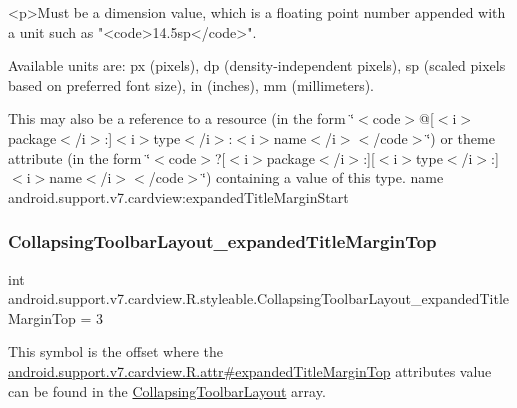 \begin{DoxyVerb}      <p>Must be a dimension value, which is a floating point number appended with a unit such as "<code>14.5sp</code>".
\end{DoxyVerb}
 Available units are\+: px (pixels), dp (density-\/independent pixels), sp (scaled pixels based on preferred font size), in (inches), mm (millimeters). 

This may also be a reference to a resource (in the form \char`\"{}$<$code$>$@\mbox{[}$<$i$>$package$<$/i$>$\+:\mbox{]}$<$i$>$type$<$/i$>$\+:$<$i$>$name$<$/i$>$$<$/code$>$\char`\"{}) or theme attribute (in the form \char`\"{}$<$code$>$?\mbox{[}$<$i$>$package$<$/i$>$\+:\mbox{]}\mbox{[}$<$i$>$type$<$/i$>$\+:\mbox{]}$<$i$>$name$<$/i$>$$<$/code$>$\char`\"{}) containing a value of this type.  name android.\+support.\+v7.\+cardview\+:expanded\+Title\+Margin\+Start \mbox{\label{classandroid_1_1support_1_1v7_1_1cardview_1_1R_1_1styleable_adb4d112ba91dd0c5abf011eb88af2a2b}} 
\subsubsection{\texorpdfstring{Collapsing\+Toolbar\+Layout\+\_\+expanded\+Title\+Margin\+Top}{CollapsingToolbarLayout\_expandedTitleMarginTop}}
{\footnotesize\ttfamily int android.\+support.\+v7.\+cardview.\+R.\+styleable.\+Collapsing\+Toolbar\+Layout\+\_\+expanded\+Title\+Margin\+Top = 3\hspace{0.3cm}{\ttfamily [static]}}

This symbol is the offset where the \hyperlink{classandroid_1_1support_1_1v7_1_1cardview_1_1R_1_1attr_af2ccc3d944b206dbd73961344a8925bd}{android.\+support.\+v7.\+cardview.\+R.\+attr\#expanded\+Title\+Margin\+Top} attribute\textquotesingle{}s value can be found in the \hyperlink{classandroid_1_1support_1_1v7_1_1cardview_1_1R_1_1styleable_a3b4c5393d0c99cb4e5a7a3911fc606b4}{Collapsing\+Toolbar\+Layout} array.

